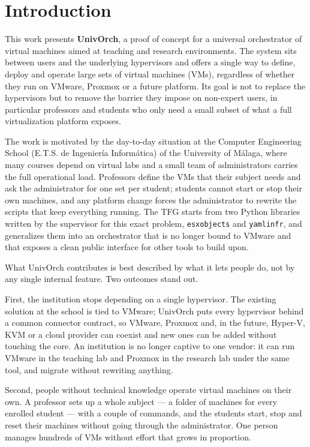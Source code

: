
\chapter{Introduction}
\label{ch:introduccion}

This work presents \textbf{UnivOrch}, a proof of concept for a
universal orchestrator of virtual machines aimed at teaching and
research environments. The system sits between users and the
underlying hypervisors and offers a single way to define, deploy and
operate large sets of virtual machines (VMs), regardless of whether
they run on VMware, Proxmox or a future platform. Its goal is not to
replace the hypervisors but to remove the barrier they impose on
non-expert users, in particular professors and students who only
need a small subset of what a full virtualization platform exposes.

The work is motivated by the day-to-day situation at the Computer
Engineering School (E.T.S. de Ingeniería Informática) of the
University of Málaga, where many courses depend on virtual labs and a
small team of administrators carries the full operational load.
Professors define the VMs that their subject needs and ask the
administrator for one set per student; students cannot start or stop
their own machines, and any platform change forces the administrator
to rewrite the scripts that keep everything running. The TFG starts
from two Python libraries written by the supervisor for this exact
problem, \texttt{esxobjects} and \texttt{yamlinfr}, and generalizes
them into an orchestrator that is no longer bound to VMware and that
exposes a clean public interface for other tools to build upon.

What UnivOrch contributes is best described by what it lets people do,
not by any single internal feature. Two outcomes stand out.

First, the institution stops depending on a single hypervisor. The
existing solution at the school is tied to VMware; UnivOrch puts every
hypervisor behind a common connector contract, so VMware, Proxmox and,
in the future, Hyper-V, KVM or a cloud provider can coexist and new
ones can be added without touching the core. An institution is no
longer captive to one vendor: it can run VMware in the teaching lab
and Proxmox in the research lab under the same tool, and migrate
without rewriting anything.

Second, people without technical knowledge operate virtual machines on
their own. A professor sets up a whole subject --- a folder of machines
for every enrolled student --- with a couple of commands, and the
students start, stop and reset their machines without going through the
administrator. One person manages hundreds of VMs without effort that
grows in proportion.

